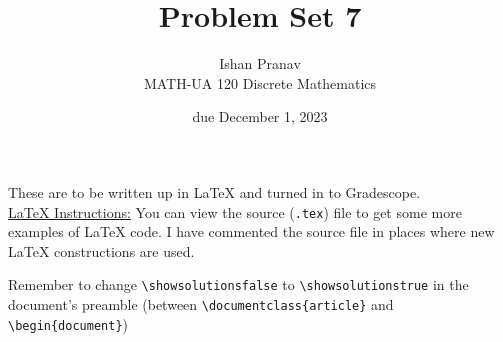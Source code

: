 \documentclass{article}
\title{Problem Set 7}
\author{%
    Ishan Pranav
\\  MATH-UA 120 Discrete Mathematics
}
\date{due December 1, 2023}
\newif\ifshowsolutions
\newcommand{\danger}{\marginpar[\hfill\dbend]{\dbend\hfill}}
\theoremstyle{definition}
\begin{document}
\maketitle
These are to be written up in \LaTeX{} and turned in to Gradescope.\\

\ifshowsolutions
    \SetupExSheets{solution/print=true}
\else
    \danger
 \underline{ \LaTeX{}  Instructions:}  You can view the source (\texttt{.tex}) file to get some more examples of \LaTeX{} code.  I have commented the source file in places where new \LaTeX{} constructions are used.
  
  Remember to change \verb|\showsolutionsfalse| to \verb|\showsolutionstrue|
    in the document's preamble 
    (between \verb|\documentclass{article}| and \verb|\begin{document}|)
\fi
\end{document}

